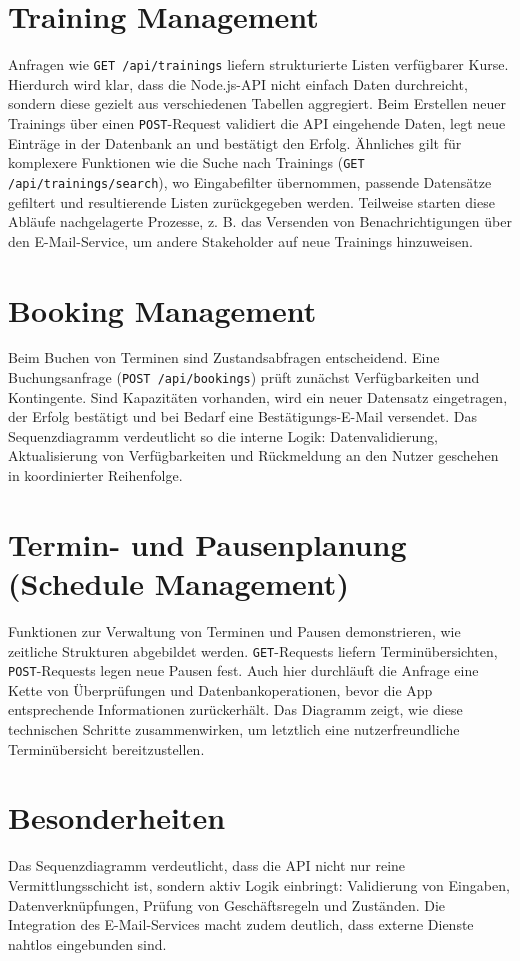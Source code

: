 \section{Training Management}
Anfragen wie \texttt{GET /api/trainings} liefern strukturierte Listen verfügbarer Kurse. Hierdurch wird klar, dass die Node.js-API 
nicht einfach Daten durchreicht, sondern diese gezielt aus verschiedenen Tabellen aggregiert. Beim Erstellen neuer Trainings über einen \texttt{POST}-Request validiert die API eingehende Daten, legt neue Einträge in der Datenbank an und bestätigt den Erfolg. Ähnliches gilt für komplexere Funktionen wie die Suche nach Trainings (\texttt{GET /api/trainings/search}), wo Eingabefilter übernommen, passende Datensätze gefiltert und resultierende Listen zurückgegeben werden. Teilweise starten diese Abläufe nachgelagerte Prozesse, z. B. das Versenden von Benachrichtigungen über den E-Mail-Service, um andere Stakeholder auf neue Trainings hinzuweisen.

\section{Booking Management}
Beim Buchen von Terminen sind Zustandsabfragen entscheidend. Eine Buchungsanfrage (\texttt{POST /api/bookings}) prüft zunächst Verfügbarkeiten und Kontingente. Sind Kapazitäten vorhanden, wird ein neuer Datensatz eingetragen, der Erfolg bestätigt und bei Bedarf eine Bestätigungs-E-Mail versendet. Das Sequenzdiagramm verdeutlicht so die interne Logik: Datenvalidierung, Aktualisierung von Verfügbarkeiten und Rückmeldung an den Nutzer geschehen in koordinierter Reihenfolge.

\section{Termin- und Pausenplanung (Schedule Management)}
Funktionen zur Verwaltung von Terminen und Pausen demonstrieren, wie zeitliche Strukturen abgebildet werden. \texttt{GET}-Requests liefern Terminübersichten, \texttt{POST}-Requests legen neue Pausen fest. Auch hier durchläuft die Anfrage eine Kette von Überprüfungen und Datenbankoperationen, bevor die App entsprechende Informationen zurückerhält. Das Diagramm zeigt, wie diese technischen Schritte zusammenwirken, um letztlich eine nutzerfreundliche Terminübersicht bereitzustellen.

\section{Besonderheiten}
Das Sequenzdiagramm verdeutlicht, dass die API nicht nur reine Vermittlungsschicht ist, sondern aktiv Logik einbringt: Validierung von Eingaben, Datenverknüpfungen, Prüfung von Geschäftsregeln und Zuständen. Die Integration des E-Mail-Services macht zudem deutlich, dass externe Dienste nahtlos eingebunden sind.

